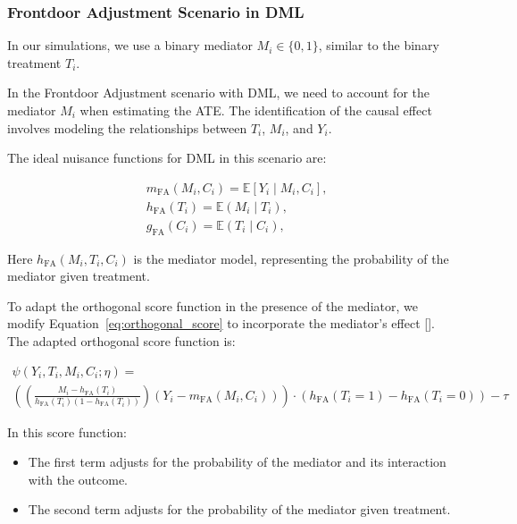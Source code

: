 \documentclass{article}
\numberwithin{equation}{section}
\begin{document}
\subsubsection{Frontdoor Adjustment Scenario in DML}

In our simulations, we use a binary mediator $M_i \in \{0, 1\}$, similar to the binary treatment $T_i$.

In the Frontdoor Adjustment scenario with DML, we need to account for the mediator $M_i$ when estimating the ATE. The identification of the causal effect involves modeling the relationships between $T_i$, $M_i$, and $Y_i$.

The ideal nuisance functions for DML in this scenario are:

\begin{align}
    & m_{\text{FA}}(M_i, C_i) = \mathbb{E}[Y_i \mid M_i, C_i],
    \label{eq:m_x_for_target_frontdoor_adjustment} \\
    & h_{\text{FA}}(T_i) = \mathbb{E}(M_i \mid T_i),
    \label{eq:h_x_for_mediator_frontdoor_adjustment} \\
    & g_{\text{FA}}(C_i) = \mathbb{E}(T_i \mid C_i),
    \label{eq:g_x_for_treatment_frontdoor_adjustment}
\end{align}

Here $h_{\text{FA}}(M_i, T_i, C_i)$ is the mediator model, representing the probability of the mediator given treatment.

To adapt the orthogonal score function in the presence of the mediator, we modify Equation~\eqref{eq:orthogonal_score} to incorporate the mediator's effect [\cite{ChernozhukovChetverikovDemireretal2018}]. The adapted orthogonal score function is:

\begin{equation}
    \begin{split}
        \psi(Y_i, T_i, M_i, C_i; \eta) = \\ \left(
        \left(
            \frac{M_i - h_{\text{FA}}(T_i)}{h_{\text{FA}}(T_i)(1 - h_{\text{FA}}(T_i))}
        \right) (Y_i - m_{\text{FA}}(M_i, C_i))
        \right)
        \cdot \left(
            h_{\text{FA}}(T_i = 1) - h_{\text{FA}}(T_i = 0)
        \right)
        - \tau
    \end{split}
    \label{eq:orthogonal_score_frontdoor}
\end{equation}

In this score function:

\begin{itemize}
    \item The first term adjusts for the probability of the mediator and its interaction with the outcome.
    \item The second term adjusts for the probability of the mediator given treatment.
\end{itemize}
\end{document}
